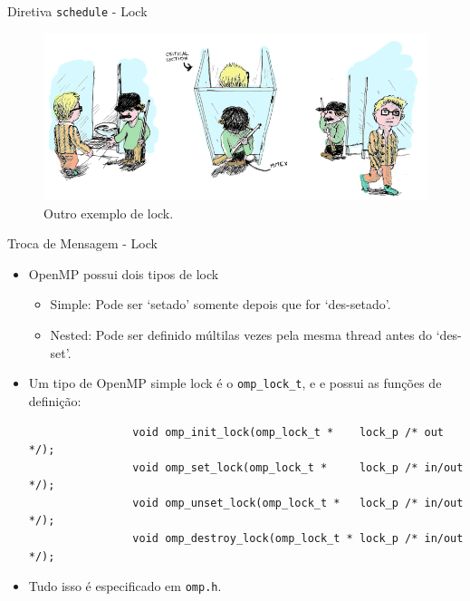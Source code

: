 	\begin{frame}{Diretiva {\tt schedule} - Lock}
		\begin{figure}[p]
			\centering
			\includegraphics[width=1\textwidth]{img/pacheco/mutex2.png}
			\caption{Outro exemplo de lock.}
		\end{figure}
	\end{frame}

	\begin{frame}[fragile]{Troca de Mensagem -  Lock}
		\begin{itemize}
			\item OpenMP possui dois tipos de lock
			\begin{itemize}
				\item Simple: Pode ser `setado' somente depois que for `des-setado'.
				\item Nested: Pode ser definido múltilas vezes pela mesma thread antes do `des-set'.
			\end{itemize}
			\item Um tipo de OpenMP simple lock é o {\tt omp\_lock\_t}, e e possui as funções de definição:
			\begin{verbatim}
				void omp_init_lock(omp_lock_t *    lock_p /* out */);
				void omp_set_lock(omp_lock_t *     lock_p /* in/out */); 
				void omp_unset_lock(omp_lock_t *   lock_p /* in/out */);  
				void omp_destroy_lock(omp_lock_t * lock_p /* in/out */);    
			\end{verbatim}
			\item Tudo isso é especificado em {\tt omp.h}.
		\end{itemize}
\end{frame}


